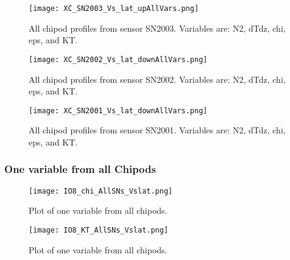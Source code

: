 \documentclass[11pt]{article}
\begin{document}
\begin{figure}[htbp] 
\texttt{[image: XC\_SN2003\_Vs\_lat\_upAllVars.png]} 
\caption{All chipod profiles from sensor SN2003. Variables are: N2, dTdz, chi, eps, and KT.} 
\label{} 
\end{figure} 

\begin{figure}[htbp] 
\texttt{[image: XC\_SN2002\_Vs\_lat\_downAllVars.png]} 
\caption{All chipod profiles from sensor SN2002. Variables are: N2, dTdz, chi, eps, and KT.} 
\label{} 
\end{figure} 

\begin{figure}[htbp] 
\texttt{[image: XC\_SN2001\_Vs\_lat\_downAllVars.png]} 
\caption{All chipod profiles from sensor SN2001. Variables are: N2, dTdz, chi, eps, and KT.} 
\label{} 
\end{figure} 

\clearpage 
\newpage 
\subsubsection{One variable from all Chipods} 

\begin{figure}[htbp] 
\texttt{[image: IO8\_chi\_AllSNs\_Vslat.png]} 
\caption{Plot of one variable from all chipods.} 
\label{} 
\end{figure} 

\begin{figure}[htbp] 
\texttt{[image: IO8\_KT\_AllSNs\_Vslat.png]} 
\caption{Plot of one variable from all chipods.} 
\label{} 
\end{figure} 
\end{document}
